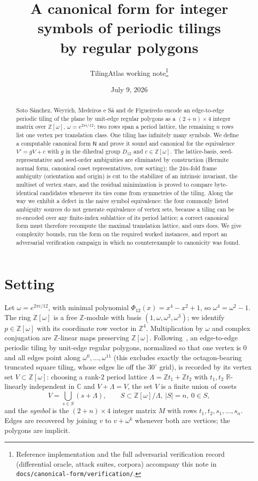 \documentclass[11pt]{article}
\title{A canonical form for integer symbols of periodic tilings\\ by regular polygons}
\author{TilingAtlas working note\thanks{Reference implementation and the full adversarial
verification record (differential oracle, attack suites, corpora) accompany this note in
\texttt{docs/canonical-form/verification/}.}}
\date{July 9, 2026}
\theoremstyle{definition}
\newcommand{\Zw}{\mathbb{Z}[\omega]}
\newcommand{\Z}{\mathbb{Z}}
\newcommand{\R}{\mathbb{R}}
\newcommand{\C}{\mathbb{C}}
\newcommand{\Lam}{\Lambda}
\newcommand{\N}{\mathsf{N}}
\begin{document}
\maketitle

\begin{abstract}
Soto S\'anchez, Weyrich, Medeiros e S\'a and de Figueiredo encode an edge-to-edge periodic
tiling of the plane by unit-edge regular polygons as a $(2+n)\times 4$ integer matrix over
$\Z[\omega]$, $\omega=e^{2\pi i/12}$: two rows span a period lattice, the remaining $n$ rows
list one vertex per translation class. One tiling has infinitely many symbols. We define a
computable canonical form $\N$ and prove it sound and canonical for the equivalence
$V'=gV+c$ with $g$ in the dihedral group $D_{12}$ and $c\in\Zw$. The lattice-basis,
seed-representative and seed-order ambiguities are eliminated by construction (Hermite
normal form, canonical coset representatives, row sorting); the $24n$-fold frame ambiguity
(orientation and origin) is cut to the stabilizer of an intrinsic invariant, the multiset of
vertex stars, and the residual minimization is proved to compare byte-identical candidates
whenever its ties come from symmetries of the tiling. Along the way we exhibit a defect in
the naive symbol equivalence: the four commonly listed ambiguity sources do not generate
equivalence of vertex sets, because a tiling can be re-encoded over any finite-index
sublattice of its period lattice; a correct canonical form must therefore recompute the
maximal translation lattice, and ours does. We give complexity bounds, run the form on the
required worked instances, and report an adversarial verification campaign in which no
counterexample to canonicity was found.
\end{abstract}

\section{Setting}\label{sec:setting}

Let $\omega=e^{2\pi i/12}$, with minimal polynomial $\Phi_{12}(x)=x^4-x^2+1$, so
$\omega^4=\omega^2-1$. The ring $\Zw$ is a free $\Z$-module with basis
$(1,\omega,\omega^2,\omega^3)$; we identify $p\in\Zw$ with its coordinate row vector in
$\Z^4$. Multiplication by $\omega$ and complex conjugation are $\Z$-linear maps preserving
$\Zw$. Following~\cite{soto2021integer}, an edge-to-edge periodic tiling by unit-edge
regular polygons, normalized so that one vertex is $0$ and all edges point along
$\omega^0,\dots,\omega^{11}$ (this excludes exactly the octagon-bearing truncated square
tiling, whose edges lie off the $30^\circ$ grid), is recorded by its vertex set
$V\subset\Zw$: choosing a rank-2 period lattice $\Lam=\Z t_1+\Z t_2$ with
$t_1,t_2$ $\R$-linearly independent in $\C$ and $V+\Lam=V$, the set $V$ is a finite union
of cosets
\[
  V=\bigcup_{s\in S}(s+\Lam),\qquad S\subset\Zw/\Lam,\ |S|=n,\ 0\in S ,
\]
and the \emph{symbol} is the $(2+n)\times4$ integer matrix $M$ with rows
$t_1,t_2,s_1,\dots,s_n$. Edges are recovered by joining $v$ to $v+\omega^k$ whenever both
are vertices; the polygons are implicit.
\end{document}
